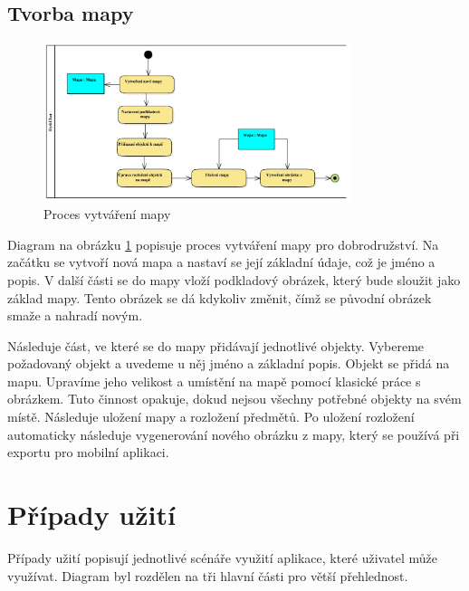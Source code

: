 \documentclass[thesis=B,czech]{resources/FITthesis}[2012/06/26]
\begin{document}
\subsection{Tvorba mapy}
\begin{figure}\centering
	\includegraphics[width=0.8\textwidth]{images/business_mapa}
	\caption[Proces vytváření mapy]{Proces vytváření mapy}\label{fig:bp_mapa}
\end{figure}	
Diagram na obrázku \ref{fig:bp_mapa} popisuje proces vytváření mapy pro dobrodružství. Na začátku se vytvoří nová mapa a nastaví se její základní údaje, což je jméno a popis. V další části se do mapy vloží podkladový obrázek, který bude sloužit jako základ mapy. Tento obrázek se dá kdykoliv změnit, čímž se původní obrázek smaže a nahradí novým. \par

Následuje část, ve které se do mapy přidávají jednotlivé objekty. Vybereme požadovaný objekt a uvedeme u něj jméno a základní popis. Objekt se přidá na mapu. Upravíme jeho velikost a umístění na mapě pomocí klasické práce s obrázkem. Tuto činnost opakuje, dokud nejsou všechny potřebné objekty na svém místě. Následuje uložení mapy a rozložení předmětů. Po uložení rozložení automaticky následuje vygenerování nového obrázku z mapy, který se používá při exportu pro mobilní aplikaci.

	\section{Případy užití}	
Případy užití popisují jednotlivé scénáře využití aplikace, které uživatel může využívat. Diagram byl rozdělen na tři hlavní části pro větší přehlednost.
\end{document}
